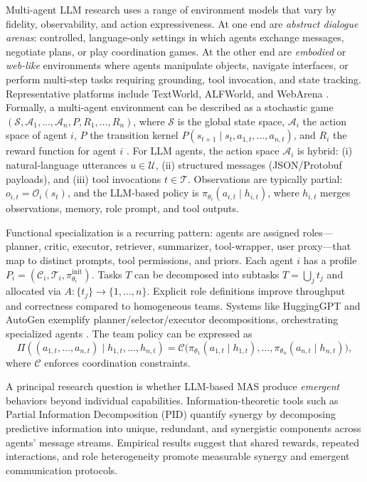 Multi-agent LLM research uses a range of environment models that vary by fidelity, observability, and action expressiveness. At one end are \emph{abstract dialogue arenas}: controlled, language-only settings in which agents exchange messages, negotiate plans, or play coordination games. At the other end are \emph{embodied} or \emph{web-like} environments where agents manipulate objects, navigate interfaces, or perform multi-step tasks requiring grounding, tool invocation, and state tracking. Representative platforms include TextWorld, ALFWorld, and WebArena . Formally, a multi-agent environment can be described as a stochastic game $(\mathcal{S}, \mathcal{A}_1,\dots,\mathcal{A}_n, P, R_1,\dots,R_n)$, where $\mathcal{S}$ is the global state space, $\mathcal{A}_i$ the action space of agent $i$, $P$ the transition kernel $P(s_{t+1}\mid s_t, a_{1,t},\dots,a_{n,t})$, and $R_i$ the reward function for agent $i$ \cite{stochastic_game_LLM}. For LLM agents, the action space $\mathcal{A}_i$ is hybrid: (i) natural-language utterances $u\in\mathcal{U}$, (ii) structured messages (JSON/Protobuf payloads), and (iii) tool invocations $t\in\mathcal{T}$. Observations are typically partial: $o_{i,t} = \mathcal{O}_i(s_t)$, and the LLM-based policy is $\pi_{\theta_i}(a_{i,t}\mid h_{i,t})$, where $h_{i,t}$ merges observations, memory, role prompt, and tool outputs.

Functional specialization is a recurring pattern: agents are assigned roles—planner, critic, executor, retriever, summarizer, tool-wrapper, user proxy—that map to distinct prompts, tool permissions, and priors. Each agent $i$ has a profile $P_i = (\mathcal{C}_i, \mathcal{T}_i, \pi_{\theta_i}^{\mathrm{init}})$. Tasks $T$ can be decomposed into subtasks $T=\bigcup_j t_j$ and allocated via $A: \{t_j\} \to \{1,\dots,n\}$. Explicit role definitions improve throughput and correctness compared to homogeneous teams. Systems like HuggingGPT and AutoGen exemplify planner/selector/executor decompositions, orchestrating specialized agents \cite{hugginggpt, autogen}. The team policy can be expressed as
\[
\Pi((a_{1,t},\dots,a_{n,t})\mid h_{1,t},\dots,h_{n,t}) = \mathcal{C}\big(\pi_{\theta_1}(a_{1,t}\mid h_{1,t}),\dots,\pi_{\theta_n}(a_{n,t}\mid h_{n,t})\big),
\]
where $\mathcal{C}$ enforces coordination constraints.

A principal research question is whether LLM-based MAS produce \emph{emergent} behaviors beyond individual capabilities. Information-theoretic tools such as Partial Information Decomposition (PID) quantify synergy by decomposing predictive information into unique, redundant, and synergistic components across agents’ message streams. Empirical results suggest that shared rewards, repeated interactions, and role heterogeneity promote measurable synergy and emergent communication protocols.

